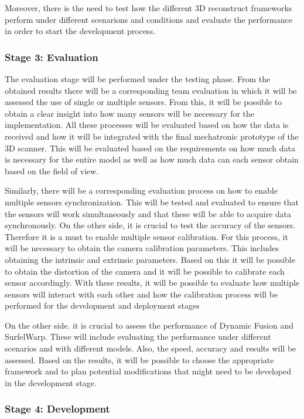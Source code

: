\documentclass[12pt]{report}
\begin{document}
Moreover, there is the need to test how the different 3D reconstruct frameworks perform under different scenarions and conditions and evaluate the performance in order to start the development process.

\subsubsection{Stage 3: Evaluation}

The evaluation stage will be performed under the testing phase. From the obtained results there will be a corresponding team evaluation in which it will be assessed the use of single or multiple sensors. 
From this, it will be possible to obtain a clear insight into how many sensors will be necessary for the implementation. All these processes will be evaluated based on how the data is received and how it will be integrated with the final mechatronic prototype of the 3D scanner. 
This will be evaluated based on the requirements on how much data is necessary for the entire model as well as how much data can each sensor obtain based on the field of view.

Similarly, there will be a corresponding evaluation process on how to enable multiple sensors synchronization. This will be tested and evaluated to ensure that the sensors will work simultaneously and that these will be able to acquire data synchronously. 
On the other side, it is crucial to test the accuracy of the sensors. Therefore it is a must to enable multiple sensor calibration. For this process, it will be necessary to obtain the camera calibration parameters. This includes obtaining the intrinsic and extrinsic parameters. 
Based on this it will be possible to obtain the distortion of the camera and it will be possible to calibrate each sensor accordingly.
With these results, it will be possible to evaluate how multiple sensors  will interact with each other and how the calibration process will be performed for the development and deployment stages

On the other side. it is crucial to assess the performance of Dynamic Fusion and SurfelWarp. 
These will include evaluating the performance under different scenarios and with different models. Also, the speed, accuracy and results will be assessed. 
Based on the results, it will be possible to choose the appropriate framework and to plan potential modifications that might need to be developed in the development stage.


\subsubsection{Stage 4: Development}
\end{document}
